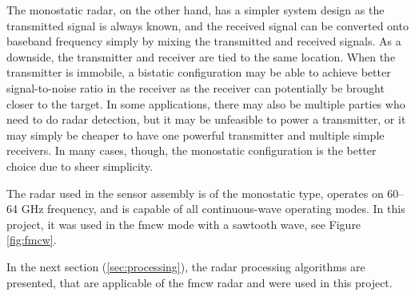 The monostatic radar, on the other hand,
has a simpler system design as the transmitted signal is always known, 
and the received signal can be converted onto baseband frequency simply 
by mixing the transmitted and received signals.
As a downside, the transmitter and receiver are tied to the same location.
When the transmitter is immobile,
a bistatic configuration may be able to achieve better signal-to-noise ratio in the receiver
as the receiver can potentially be brought closer to the target.
In some applications, there may also be multiple parties who need to do radar detection,
but it may be unfeasible to power a transmitter,
or it may simply be cheaper to have one powerful transmitter and multiple simple receivers.
In many cases, though,
the monostatic configuration is the better choice due to sheer simplicity.

The radar used in the sensor assembly is of the monostatic type,
operates on 60--64 GHz frequency,
and is capable of all continuous-wave operating modes.
In this project, it was used in the \gls{fmcw} mode with a sawtooth wave,
see Figure \ref{fig:fmcw}.

In the next section (\ref{sec:processing}),
the radar processing algorithms are presented,
that are applicable of the \gls{fmcw} radar and were used in this project.

